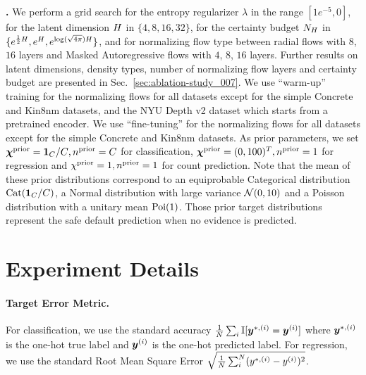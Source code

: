 \textbf{\NatPN{}.} We perform a grid search for the entropy regularizer $\lambda$ in the range $[1e^{-5}, 0]$, for the latent dimension $H$ in $\{4, 8, 16, 32\}$, for the certainty budget $N_H$ in $\{e^{\frac{1}{2}H}, e^{H}, e^{\log(\sqrt{4\pi})H}\}$, and for normalizing flow type between radial flows \citep{radialflow} with $8$, $16$ layers and Masked Autoregressive flows \citep{maf, made} with $4$, $8$, $16$ layers. Further results on latent dimensions, density types, number of normalizing flow layers and certainty budget are presented in Sec.~\ref{sec:ablation-study_007}. We use ``warm-up'' training for the normalizing flows for all datasets except for the simple Concrete and Kin8nm datasets, and the NYU Depth v2 dataset which starts from a pretrained encoder. We use ``fine-tuning'' for the normalizing flows for all datasets except for the simple Concrete and Kin8nm datasets. As prior parameters, we set ${\bm{\chi}^\text{prior}=\bm{1}_{C}/C}, {n^\text{prior}=C}$ for classification, ${\bm{\chi}^\text{prior}=(0, 100)^T}, n^\text{prior}=1$ for regression and $\chi^\text{prior}=1, n^\text{prior}=1$ for count prediction. Note that the mean of these prior distributions correspond to an equiprobable Categorical distribution $\operatorname{Cat}(\bm{1}_{C}/C)$, a Normal distribution with large variance $\operatorname{\mathcal{N}}(0, 10)$ and a Poisson distribution with a unitary mean $\operatorname{Poi}(1)$. Those prior target distributions represent the safe default prediction when no evidence is predicted.

\section{Experiment Details}
\label{sec:experiment}

\paragraph{Target Error Metric.} For classification, we use the standard accuracy $\frac{1}{N}\sum_{i} \mathbb{I}[\bm{y}^{*,(i)} = \bm{y}^{(i)}]$ where $\bm{y}^{*,(i)}$ is the one-hot true label and $\bm{y}^{(i)}$ is the one-hot predicted label. For regression, we use the standard Root Mean Square Error $\sqrt{\frac{1}{N}\sum_{i}^{N} (y^{*,(i)} - y^{(i)})^2}$.


